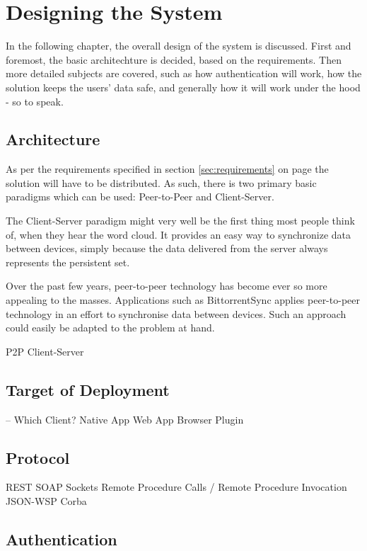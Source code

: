 \chapter{Designing the System}
	In the following chapter, the overall design of the system is discussed. First and foremost, the basic architechture is decided, based on the requirements. Then more detailed subjects are covered, such as how authentication will work, how the solution keeps the users' data safe, and generally how it will work under the hood - so to speak.

	\section{Architecture}
		As per the requirements specified in section \ref{sec:requirements} on page \pageref{sec:requirements} the solution will have to be distributed. As such, there is two primary basic paradigms which can be used: Peer-to-Peer and Client-Server.

		The Client-Server paradigm might very well be the first thing most people think of, when they hear the word cloud. It provides an easy way to synchronize data between devices, simply because the data delivered from the server always represents the persistent set.


		Over the past few years, peer-to-peer technology has become ever so more appealing to the masses. Applications such as BittorrentSync applies peer-to-peer technology in an effort to synchronise data between devices. Such an approach could easily be adapted to the problem at hand. 




		P2P
		Client-Server

	\section{Target of Deployment}

		-- Which Client?
		Native App
		Web App
		Browser Plugin

	\section{Protocol}
		REST
		SOAP
		Sockets
		Remote Procedure Calls / Remote Procedure Invocation
		JSON-WSP
		Corba

	\section{Authentication}
